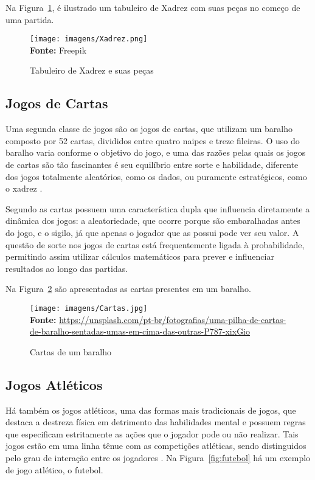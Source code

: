 Na Figura~\ref{fig:xadrez}, é ilustrado um tabuleiro de Xadrez com suas peças no começo de uma partida.


\FloatBarrier
\begin{figure}[!htbp]
	\centering
	\caption{Tabuleiro de Xadrez e suas peças}
	\texttt{[image: imagens/Xadrez.png]}
	\\\textbf{Fonte:} Freepik
	\label{fig:xadrez}
\end{figure}
\FloatBarrier

\subsection{Jogos de Cartas}

Uma segunda classe de jogos são os jogos de cartas, que utilizam um baralho composto por 52 cartas, divididos entre quatro naipes e treze fileiras. O uso do baralho varia conforme o objetivo do jogo, e uma das razões pelas quais os jogos de cartas são tão fascinantes é seu equilíbrio entre sorte e habilidade, diferente dos jogos totalmente aleatórios, como os dados, ou puramente estratégicos, como o xadrez \cite{Parlett1990}.


Segundo  as cartas possuem uma característica dupla que influencia diretamente a dinâmica dos jogos: a aleatoriedade, que ocorre porque são embaralhadas antes do jogo, e o sigilo, já que apenas o jogador que as possui pode ver seu valor. A questão de sorte nos jogos de cartas está frequentemente ligada à probabilidade, permitindo assim utilizar cálculos matemáticos para prever e influenciar resultados ao longo das partidas. 

Na Figura~\ref{fig:cartas} são apresentadas as cartas presentes em um baralho.


\FloatBarrier 
\begin{figure}[!htbp]
	\centering
	\caption{Cartas de um baralho}
	\texttt{[image: imagens/Cartas.jpg]}
	\\\textbf{Fonte:} \url{https://unsplash.com/pt-br/fotografias/uma-pilha-de-cartas-de-baralho-sentadas-umas-em-cima-das-outras-P787-xixGio}
	\label{fig:cartas}
\end{figure}
\FloatBarrier


\subsection{Jogos Atléticos}


Há também os jogos atléticos, uma das formas mais tradicionais de jogos, que destaca a destreza física em detrimento das habilidades mental e possuem regras que especificam estritamente as ações que o jogador pode ou não realizar. Tais jogos estão em uma linha tênue com as competições atléticas, sendo distinguidos pelo grau de interação entre os jogadores \cite{Crawford1997}. Na Figura~\ref{fig:futebol} há um exemplo de jogo atlético, o futebol.


